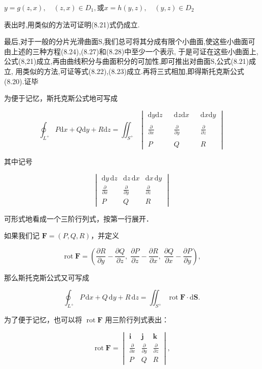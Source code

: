 \documentclass{article}
\begin{document}
$y=g\left(z,x\right),\quad(z,x)\in D_1,$或$x=h\left(y,z\right),\quad(y,z)\in D_2$

表出时,用类似的方法可证明(8.21)式仍成立.

最后,对于一般的分片光滑曲面S,我们总可将其分成有限个小曲面,使这些小曲面可由上述的三种方程(8.24),(8.27)和(8.28)中至少一个表示,
于是可证在这些小曲面上,公式(8,21)成立,再由曲线积分与曲面积分的可加性,即可推出对曲面S,公式(8.21)成立,
用类似的方法,可证等式(8.22),(8.23)成立.再将三式相加,即得斯托克斯公式(8.20).证毕

为便于记忆，斯托克斯公式地可写成

$$\oint_{L^+}P\mathrm{d}x+Q\mathrm{d}y+R\mathrm{d}z=\iint_{S^+}\begin{vmatrix}\mathrm{d}y\mathrm{d}z&&\mathrm{d}z\mathrm{d}x&&\mathrm{d}x\mathrm{d}y\\\\\frac{\partial}{\partial x}&&\frac{\partial}{\partial y}&&\frac{\partial}{\partial z}\\\\P&&Q&&R\end{vmatrix}$$

其中记号

$$\begin{vmatrix}
\mathrm{d}y\,\mathrm{d}z & \mathrm{d}z\,\mathrm{d}x & \mathrm{d}x\,\mathrm{d}y \\
\frac{\partial}{\partial x} & \frac{\partial}{\partial y} & \frac{\partial}{\partial z} \\
P & Q & R
\end{vmatrix}$$

可形式地看成一个三阶行列式，按第一行展开．

如果我们记 $\boldsymbol{F} = (P, Q, R)$，并定义

$$\operatorname{rot}\boldsymbol{F} = \left( \frac{\partial R}{\partial y} - \frac{\partial Q}{\partial z},\; \frac{\partial P}{\partial z} - \frac{\partial R}{\partial x},\; \frac{\partial Q}{\partial x} - \frac{\partial P}{\partial y} \right),$$

那么斯托克斯公式又可写成

$$\oint_{L^+} P\,\mathrm{d}x + Q\,\mathrm{d}y + R\,\mathrm{d}z = \iint_{S^+} \operatorname{rot}\boldsymbol{F} \cdot \mathrm{d}\boldsymbol{S}.$$

为了便于记忆，也可以将 $\operatorname{rot}\boldsymbol{F}$ 用三阶行列式表出：

$$\operatorname{rot}\boldsymbol{F} =
\begin{vmatrix}
\boldsymbol{i} & \boldsymbol{j} & \boldsymbol{k} \\
\frac{\partial}{\partial x} & \frac{\partial}{\partial y} & \frac{\partial}{\partial z} \\
P & Q & R
\end{vmatrix},$$
\end{document}
